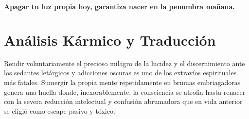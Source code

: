 \vspace{1em}
\begin{center}
    \textbf{\Large Apagar tu luz propia hoy, garantiza nacer en la penumbra mañana.}
\end{center}
\vspace{1em}

\section{Análisis Kármico y Traducción}
\begin{figure}
  \vspace{-1.5em}
  \begin{center}
  \end{center}
  \vspace{-1.5em}
\end{figure}
Rendir voluntariamente el precioso milagro de la lucidez y el discernimiento ante los sedantes letárgicos y adicciones oscuras es uno de los extravíos espirituales más fatales. Sumergir la propia mente repetidamente en brumas embriagadoras genera una huella donde, inexorablemente, la consciencia se atrofia hasta renacer con la severa reducción intelectual y confusión abrumadora que en vida anterior se eligió como escape pasivo y tóxico.

